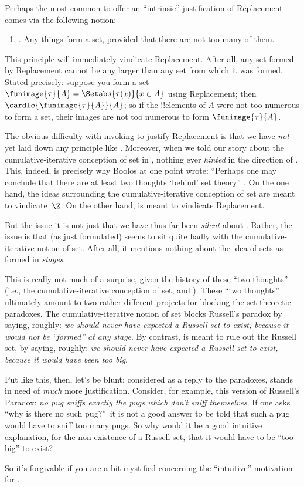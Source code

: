 \documentclass[../../../include/open-logic-section]{subfiles}
\begin{document}

Perhaps the most common to offer an ``intrinsic'' justification of
Replacement comes via the following notion:
\begin{enumerate}
	\item[] \limofsize. Any things form a set, provided that there are
	not too many of them.
\end{enumerate}
This principle will immediately vindicate Replacement. After all, any
set formed by Replacement cannot be any larger than any set from which
it was formed. Stated precisely: suppose you form a set
$\funimage{\tau}{A} = \Setabs{\tau(x)}{x \in A}$ using Replacement;
then $\cardle{\funimage{\tau}{A}}{A}$; so if the !!{element}s of $A$
were not too numerous to form a set, their images are not too numerous
to form $\funimage{\tau}{A}$. 

The obvious difficulty with invoking \limofsize{} to justify
Replacement is that we have \emph{not} yet laid down any principle
like \limofsize. Moreover, when we told our story about the
cumulative-iterative conception of set in
, nothing ever \emph{hinted}
in the direction of \limofsize. This, indeed, is precisely why Boolos
at one point wrote: ``Perhaps one may conclude that there are at least
two thoughts `behind' set theory'' \citeyearpar[p.~19]{Boolos1989}. On
the one hand, the ideas surrounding the cumulative-iterative
conception of set are meant to vindicate~$\Z$. On the other hand,
\limofsize{} is meant to vindicate Replacement. 

But the issue it is not just that we have thus far been \emph{silent}
about \limofsize. Rather, the issue is that \limofsize{} (as just
formulated) seems to sit quite badly with the cumulative-iterative
notion of set. After all, it mentions nothing about the idea of sets
as formed in \emph{stages}.

This is really not much of a surprise, given the history of these
``two thoughts'' (i.e., the cumulative-iterative conception of set,
and \limofsize). These ``two thoughts'' ultimately amount to two
rather  different projects for blocking the set-theoretic paradoxes.
The cumulative-iterative notion of set blocks Russell's paradox by
saying, roughly: \emph{we should never have expected a Russell set to
exist, because it would not be ``formed'' at any stage}. By contrast,
\limofsize{} is meant to rule out the Russell set, by saying, roughly:
\emph{we should never have expected a Russell set to exist, because it
would have been too big}. 

Put like this, then, let's be blunt: considered as a reply to the
paradoxes, \limofsize{} stands in need of \emph{much} more
justification. Consider, for example, this version of Russell's
Paradox: \emph{no pug sniffs exactly the pugs which don't sniff
themselves}. If one asks ``why is there no such pug?''\ it is not a
good answer to be told that such a pug would have to sniff too many
pugs. So why would it be a good intuitive explanation, for the
non-existence of a Russell set, that it would have to be ``too big''
to exist? 

So it's forgivable if you are a bit mystified concerning the ``intuitive''
motivation for \limofsize. 
\end{document}
